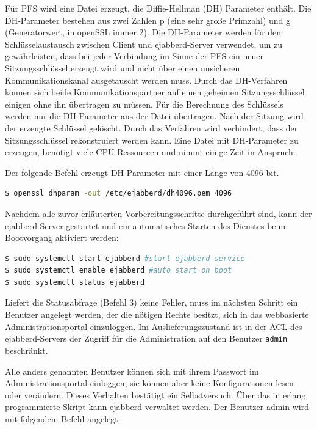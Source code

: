 \documentclass[a4paper,titlepage,halfparskip,12pt]{scrreprt}
\begin{document}
\begin{onehalfspacing}
Für \ac{PFS} wird eine Datei erzeugt, die Diffie-Hellman (DH) Parameter enthält. Die DH-Parameter bestehen aus zwei Zahlen p (eine sehr große Primzahl) und g (Generatorwert, in openSSL immer 2). Die DH-Parameter werden für den Schlüsselaustausch zwischen Client und ejabberd-Server verwendet, um zu gewährleisten, dass bei jeder Verbindung im Sinne der \ac{PFS} ein neuer Sitzungsschlüssel erzeugt wird und nicht über einen unsicheren Kommunikationskanal ausgetauscht werden muss. Durch das DH-Verfahren können sich beide Kommunikationspartner auf einen geheimen Sitzungsschlüssel einigen ohne ihn übertragen zu müssen. Für die Berechnung des Schlüssels werden nur die DH-Parameter aus der Datei übertragen. Nach der Sitzung wird der erzeugte Schlüssel gelöscht. Durch das Verfahren wird verhindert, dass der Sitzungsschlüssel rekonstruiert werden kann. Eine Datei mit DH-Parameter zu erzeugen, benötigt viele CPU-Ressourcen und nimmt einige Zeit in Anspruch.\cite{perfectForwardSecrecy}

Der folgende Befehl erzeugt DH-Parameter mit einer Länge von 4096 bit.

\bigskip

\begin{lstlisting}[language=bash, caption={Erzeugen von Diffie-Hellman-Parametern für den ejabberd-Server},label={lst:DHParameters}]
$ openssl dhparam -out /etc/ejabberd/dh4096.pem 4096
\end{lstlisting}

Nachdem alle zuvor erläuterten Vorbereitungsschritte durchgeführt sind, kann der ejabberd-Server gestartet und ein automatisches Starten des Dienstes beim Bootvorgang aktiviert werden:

\bigskip

\begin{lstlisting}[language=bash, caption={Starten der ejabberd-Instanz}]
$ sudo systemctl start ejabberd #start ejabberd service
$ sudo systemctl enable ejabberd #auto start on boot
$ sudo systemctl status ejabberd
\end{lstlisting}

Liefert die Statusabfrage (Befehl 3) keine Fehler, muss im nächsten Schritt ein Benutzer angelegt werden, der die nötigen Rechte besitzt, sich in das webbasierte Administrationsportal einzuloggen. Im Auslieferungszustand ist in der \ac{ACL} des ejabberd-Servers der Zugriff für die Administration auf den Benutzer \texttt{admin} beschränkt.\cite{ejabberdMGMT}

Alle anders genannten Benutzer können sich mit ihrem Passwort im Administrationsportal einloggen, sie können aber keine Konfigurationen lesen oder verändern. Dieses Verhalten bestätigt ein Selbstversuch. Über das in erlang programmierte Skript kann ejabberd verwaltet werden. Der Benutzer admin wird mit folgendem Befehl angelegt:\cite{ejabberdMGMT}


\end{onehalfspacing}
\end{document}
